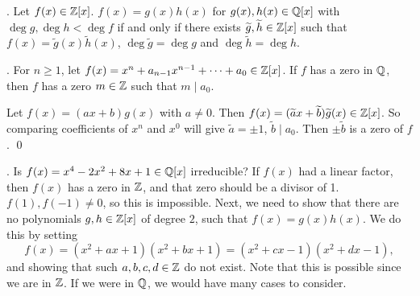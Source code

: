 \thm. Let \(f(x) \in \mathbb{Z}[x]\). \(f(x) = g(x) h(x)\) for \(g(x), h(x) \in \mathbb{Q}[x]\) with \(\deg g, \deg h < \deg f\) if and only if there exists \(\widetilde{g}, \widetilde{h} \in \mathbb{Z}[x]\) such that \(f(x) = \widetilde{g}(x) \widetilde{h}(x)\), \(\deg \widetilde{g} = \deg g\) and \(\deg \widetilde{h} = \deg h\).

\cor. For \(n \geq 1\), let \(f(x) = x^n + a_{n-1}x^{n-1} + \cdots + a_0 \in \mathbb{Z}[x]\). If \(f\) has a zero in \(\mathbb{Q}\), then \(f\) has a zero \(m \in \mathbb{Z}\) such that \(m \mid a_0\).

\pf Let \(f(x) = (ax + b) g(x)\) with \(a \neq 0\). Then \(f(x) = (\widetilde{a}x + \widetilde{b})\widetilde{g}(x) \in \mathbb{Z}[x]\). So comparing coefficients of \(x^n\) and \(x^0\) will give \(\widetilde{a} = \pm 1\), \(\widetilde{b} \mid a_0\). Then \(\pm\widetilde{b}\) is a zero of \(f\). \qed

\ex. Is \(f(x) = x^4 - 2x^2 + 8x + 1 \in \mathbb{Q}[x]\) irreducible? If \(f(x)\) had a linear factor, then \(f(x)\) has a zero in \(\mathbb{Z}\), and that zero should be a divisor of 1. \(f(1), f(-1) \neq 0\), so this is impossible. Next, we need to show that there are no polynomials \(g, h \in \mathbb{Z}[x]\) of degree \(2\), such that \(f(x) = g(x) h(x)\). We do this by setting
\[
    f(x) = (x^2 + ax + 1)(x^2 + bx + 1) = (x^2 + cx - 1)(x^2 + dx - 1),
\]
and showing that such \(a, b, c, d \in \mathbb{Z}\) do not exist. Note that this is possible since we are in \(\mathbb{Z}\). If we were in \(\mathbb{Q}\), we would have many cases to consider.

\smallskip
